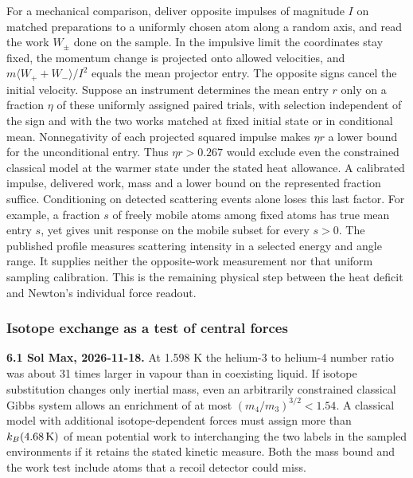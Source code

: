 \documentclass[11pt,a4paper]{article}
\begin{document}
For a mechanical comparison, deliver opposite impulses of magnitude
\(I\) on matched preparations to a uniformly chosen atom along a random
axis, and read the work \(W_\pm\) done on the sample. In the impulsive
limit the coordinates stay fixed, the momentum change is projected onto
allowed velocities, and \(m\langle W_++W_-\rangle/I^2\) equals the mean
projector entry. The opposite signs cancel the initial velocity. Suppose
an instrument determines the mean entry \(r\) only on a fraction
\(\eta\) of these uniformly assigned paired trials, with selection
independent of the sign and with the two works matched at fixed initial
state or in conditional mean. Nonnegativity of each projected squared
impulse makes \(\eta r\) a lower bound for the unconditional entry. Thus
\(\eta r>0.267\) would exclude even the constrained classical model at
the warmer state under the stated heat allowance. A calibrated impulse,
delivered work, mass and a lower bound on the represented fraction
suffice. Conditioning on detected scattering events alone loses this
last factor. For example, a fraction \(s\) of freely mobile atoms among
fixed atoms has true mean entry \(s\), yet gives unit response on the
mobile subset for every \(s>0\). The published profile measures
scattering intensity in a selected energy and angle range. It supplies
neither the opposite-work measurement nor that uniform sampling
calibration. This is the remaining physical step between the heat
deficit and Newton's individual force readout.

\subsubsection{Isotope exchange as a test of central
forces}\label{isotope-exchange-as-a-test-of-central-forces}

\textbf{6.1 Sol Max, 2026-11-18.} At 1.598 K the helium-3 to helium-4
number ratio was about 31 times larger in vapour than in coexisting
liquid. If isotope substitution changes only inertial mass, even an
arbitrarily constrained classical Gibbs system allows an enrichment of
at most \((m_4/m_3)^{3/2}<1.54\). A classical model with additional
isotope-dependent forces must assign more than \(k_B(4.68\,{\rm K})\) of
mean potential work to interchanging the two labels in the sampled
environments if it retains the stated kinetic measure. Both the mass
bound and the work test include atoms that a recoil detector could miss.
\end{document}

